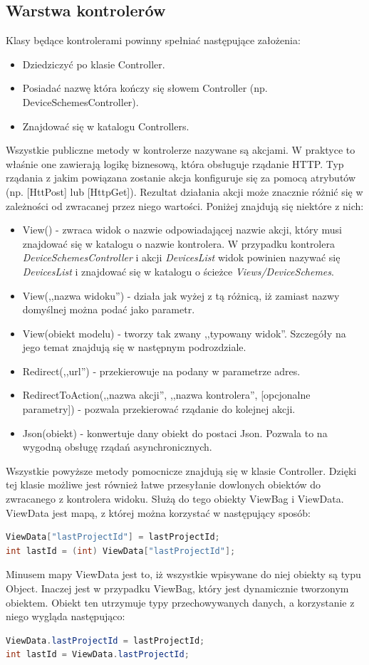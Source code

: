 \subsection{Warstwa kontrolerów}
Klasy będące kontrolerami powinny spełniać następujące założenia:
\begin{itemize}
\item Dziedziczyć po klasie Controller. 
\item Posiadać nazwę która kończy się słowem Controller (np. DeviceSchemesController).
\item Znajdować się w katalogu Controllers.
\end{itemize}
Wszystkie publiczne metody w kontrolerze nazywane są akcjami. W praktyce to właśnie one zawierają logikę biznesową, która obsługuje rządanie HTTP. Typ rządania z jakim powiązana zostanie akcja konfiguruje się za pomocą atrybutów (np. [HttPost] lub [HttpGet]). Rezultat działania akcji może znacznie różnić się w zależności od zwracanej przez niego wartości. Poniżej znajdują się niektóre z nich:
\begin{itemize}
\item View() - zwraca widok o nazwie odpowiadającej nazwie akcji, który musi znajdować się w katalogu o nazwie kontrolera. W przypadku kontrolera \textit{DeviceSchemesController} i akcji \textit{DevicesList} widok powinien nazywać się \textit{DevicesList} i znajdować się w katalogu o ścieżce \textit{Views/DeviceSchemes}.
\item View(,,nazwa widoku'') - działa jak wyżej z tą różnicą, iż zamiast nazwy domyślnej można podać jako parametr.
\item View(obiekt modelu) - tworzy tak zwany ,,typowany widok''. Szczegóły na jego temat znajdują się w następnym podrozdziale.
\item Redirect(,,url'') - przekierowuje na podany w parametrze adres.
\item RedirectToAction(,,nazwa akcji'', ,,nazwa kontrolera'', [opcjonalne parametry]) - pozwala przekierować rządanie do kolejnej akcji.
\item Json(obiekt) - konwertuje dany obiekt do postaci Json. Pozwala to na wygodną obsługę rządań asynchronicznych.
\end{itemize}
Wszystkie powyższe metody pomocnicze znajdują się w klasie Controller. Dzięki tej klasie możliwe jest również łatwe przesyłanie dowlonych obiektów do zwracanego z kontrolera widoku. Służą do tego obiekty ViewBag i ViewData. ViewData jest mapą, z której można korzystać w następujący sposób:
\begin{lstlisting}[language=Java]
ViewData["lastProjectId"] = lastProjectId;
int lastId = (int) ViewData["lastProjectId"];
\end{lstlisting}
Minusem mapy ViewData jest to, iż wszystkie wpisywane do niej obiekty są typu Object.
Inaczej jest w przypadku ViewBag, który jest dynamicznie tworzonym obiektem.  Obiekt ten utrzymuje typy przechowywanych danych, a korzystanie z niego wygląda następująco:
\begin{lstlisting}[language=Java]
ViewData.lastProjectId = lastProjectId;
int lastId = ViewData.lastProjectId;
\end{lstlisting}


